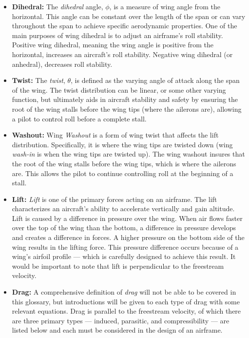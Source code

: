 \documentclass{report}
\begin{document}
\begin{itemize}
    \item[] \textbf{Dihedral:} The \textit{dihedral} angle, $\phi$, is a measure of wing angle from the horizontal. This angle can be constant over the length of the span
    or can vary throughout the span to achieve specific aerodynamic properties. One of the main purposes of wing dihedral is to adjust an airframe's
    roll stability. Positive wing dihedral, meaning the wing angle is positive from the horizontal, increases an aircraft's roll stability. Negative wing dihedral (or anhedral), 
    decreases roll stability.

    \item[] \textbf{Twist:} The \textit{twist}, $\theta$, is defined as the varying angle of attack along the span of the wing. The twist distribution can be linear, or some other
    varying function, but ultimately aids in aircraft stability and safety by ensuring the root of the wing stalls before the wing tips (where the ailerons are), allowing a pilot
    to control roll before a complete stall.
    
    \item[] \textbf{Washout:} Wing \textit{Washout} is a form of wing twist that affects the lift distribution. Specifically, it is where the wing tips are twisted down (wing \textit{wash-in}
    is when the wing tips are twisted up). The wing washout insures that the root of the wing stalls before the wing tips, which is where the ailerons are. This allows the pilot to continue
    controlling roll at the beginning of a stall.
    
    \item[] \textbf{Lift:} \textit{Lift} is one of the primary forces acting on an airframe. The lift characterizes an aircraft's ability to accelerate vertically and gain altitude.
    Lift is caused by a difference in pressure over the wing. When air flows faster over the top of the wing than the bottom, a difference in pressure develops and creates a difference
    in forces. A higher pressure on the bottom side of the wing results in the lifting force. This pressure difference occurs because of a wing's airfoil profile --- which is carefully
    designed to achieve this result. It would be important to note that lift is perpendicular to the freestream velocity.
    
    \item[] \textbf{Drag:}
    A comprehensive definition of \textit{drag} will not be able to be covered in this glossary, but  introductions will be given to each type of drag 
    with some relevant equations. Drag is parallel to the freestream velocity, of which there are three primary types --- induced, parasitic, and compressibility --- are listed below and each must be considered in the design of an airframe.
    

\end{itemize}
\end{document}
